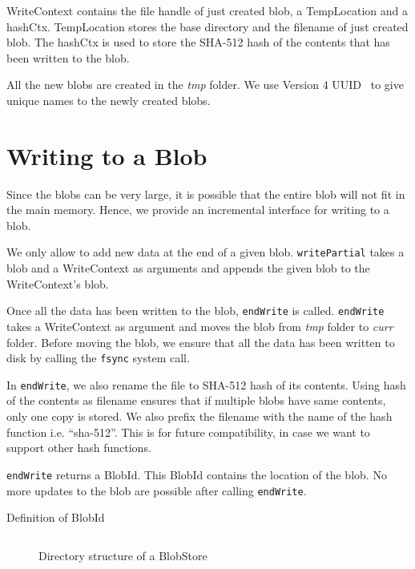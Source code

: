 WriteContext contains the file handle of just created blob, a TempLocation and a hashCtx. TempLocation stores the base directory and the filename of just created blob. The hashCtx is used to store the SHA-512 hash of the contents that has been written to the blob.

All the new blobs are created in the \textit{tmp} folder. We use Version 4 UUID~\cite{leach2005universally} to give unique names to the newly created blobs.

\section{Writing to a Blob}
Since the blobs can be very large, it is possible that the entire blob will not fit in the main memory. Hence, we provide an incremental interface for writing to a blob.

We only allow to add new data at the end of a given blob. \texttt{writePartial} takes a blob and a WriteContext as arguments and appends the given blob to the WriteContext's blob.

Once all the data has been written to the blob, \texttt{endWrite} is called. \texttt{endWrite} takes a WriteContext as argument and moves the blob from \textit{tmp} folder to \textit{curr} folder. Before moving the blob, we ensure that all the data has been written to disk by calling the \texttt{fsync} system call.

In \texttt{endWrite}, we also rename the file to SHA-512 hash of its contents. Using hash of the contents as filename ensures that if multiple blobs have same contents, only one copy is stored. We also prefix the filename with the name of the hash function i.e. ``sha-512''. This is for future compatibility, in case we want to support other hash functions.

\texttt{endWrite} returns a BlobId. This BlobId contains the location of the blob. No more updates to the blob are possible after calling \texttt{endWrite}.

\begin{program}
  \caption{Definition of BlobId}
  \label{prog:defblobid}
  \inputminted{haskell}{hs/blobid.hs}
\end{program}

\begin{figure}[hbt]
  \caption{Directory structure of a BlobStore}
  \label{fig:blobstore-dirstructure}
\end{figure}

